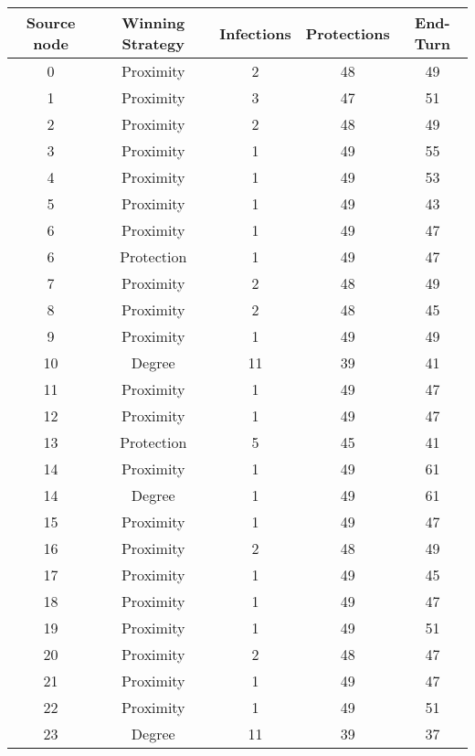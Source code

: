 \documentclass[results.tex]{subfiles}
\begin{document}
\begin{center}
  \begin{tabular}{| c || c | c | c | c |}
    \hline
    {\bfseries Source node} & {\bfseries Winning Strategy} & {\bfseries Infections} & {\bfseries Protections} & {\bfseries End-Turn} \\  %
    \hline\hline
    0 & Proximity & 2 & 48 & 49 \\ 
    \hline
    1 & Proximity & 3 & 47 & 51 \\ 
    \hline
    2 & Proximity & 2 & 48 & 49 \\ 
    \hline
    3 & Proximity & 1 & 49 & 55 \\ 
    \hline
    4 & Proximity & 1 & 49 & 53 \\ 
    \hline
    5 & Proximity & 1 & 49 & 43 \\ 
    \hline
    6 & Proximity & 1 & 49 & 47 \\ 
    \hline
    6 & Protection & 1 & 49 & 47 \\ 
    \hline
    7 & Proximity & 2 & 48 & 49 \\ 
    \hline
    8 & Proximity & 2 & 48 & 45 \\ 
    \hline
    9 & Proximity & 1 & 49 & 49 \\ 
    \hline
    10 & Degree & 11 & 39 & 41 \\ 
    \hline
    11 & Proximity & 1 & 49 & 47 \\ 
    \hline
    12 & Proximity & 1 & 49 & 47 \\ 
    \hline
    13 & Protection & 5 & 45 & 41 \\ 
    \hline
    14 & Proximity & 1 & 49 & 61 \\ 
    \hline
    14 & Degree & 1 & 49 & 61 \\ 
    \hline
    15 & Proximity & 1 & 49 & 47 \\ 
    \hline
    16 & Proximity & 2 & 48 & 49 \\ 
    \hline
    17 & Proximity & 1 & 49 & 45 \\ 
    \hline
    18 & Proximity & 1 & 49 & 47 \\ 
    \hline
    19 & Proximity & 1 & 49 & 51 \\ 
    \hline
    20 & Proximity & 2 & 48 & 47 \\ 
    \hline
    21 & Proximity & 1 & 49 & 47 \\ 
    \hline
    22 & Proximity & 1 & 49 & 51 \\ 
    \hline
    23 & Degree & 11 & 39 & 37 \\ 

\end{tabular}
\end{center}
\end{document}
